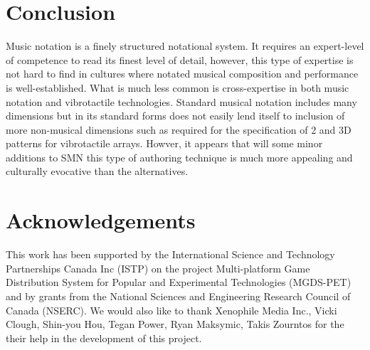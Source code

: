 \documentclass[a4paper, twocolumn]{article}
\begin{document}
\section{Conclusion}
Music notation is a finely structured notational system. It requires an expert-level of competence to read its finest level of detail, however, this type of expertise is not hard to find in cultures where notated musical composition and performance is well-established. What is much less common is cross-expertise in both music notation and vibrotactile technologies. Standard musical notation includes many dimensions but in its standard forms does not easily lend itself to inclusion of more non-musical dimensions such as required for the specification of 2 and 3D patterns for vibrotactile arrays. Howver, it appears that will some minor additions to SMN this type of authoring technique is much more appealing and culturally evocative than the alternatives. 

\section{Acknowledgements}
This work has been supported by the International Science and Technology Partnerships Canada Inc (ISTP) on the project Multi-platform Game Distribution System for Popular and Experimental Technologies (MGDS-PET) and by grants from the National Sciences and Engineering Research Council of Canada (NSERC). We would also like to thank Xenophile Media Inc., Vicki Clough, Shin-you Hou, Tegan Power, Ryan Maksymic, Takis Zourntos for the their help in the development of this project. 




  
\end{document}
